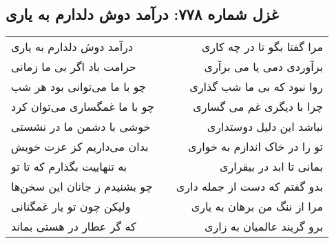 \begin{center}
\section*{غزل شماره ۷۷۸: درآمد دوش دلدارم به یاری}
\label{sec:778}
\begin{longtable}{l p{0.5cm} r}
درآمد دوش دلدارم به یاری
&&
مرا گفتا بگو تا در چه کاری
\\
حرامت باد اگر بی ما زمانی
&&
برآوردی دمی یا می برآری
\\
چو با ما می‌توانی بود هر شب
&&
روا نبود که بی ما شب گذاری
\\
چو با ما غمگساری می‌توان کرد
&&
چرا با دیگری غم می گساری
\\
خوشی با دشمن ما در نشستی
&&
نباشد این دلیل دوستداری
\\
بدان می‌داریم کز عزت خویش
&&
تو را در خاک اندازم به خواری
\\
به تنهاییت بگذارم که تا تو
&&
بمانی تا ابد در بیقراری
\\
چو بشنیدم ز جانان این سخن‌ها
&&
بدو گفتم که دست از جمله داری
\\
ولیکن چون تو یار غمگنانی
&&
مرا از ننگ من برهان به یاری
\\
که گر عطار در هستی بماند
&&
برو گریند عالمیان به زاری
\\
\end{longtable}
\end{center}
